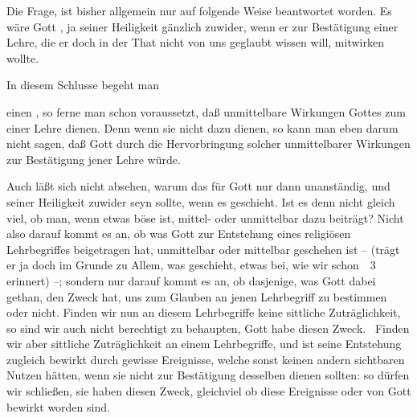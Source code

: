 Die Frage,  ist bisher allgemein nur auf folgende Weise beantwortet worden. Es wäre Gott , ja seiner Heiligkeit gänzlich zuwider, wenn er zur Bestätigung einer Lehre, die er doch in der That nicht von uns geglaubt wissen will,  mitwirken wollte.\par
In diesem Schlusse begeht man
\begin{aufza}
\item einen , so ferne man schon voraussetzt, daß unmittelbare Wirkungen Gottes zum  einer Lehre dienen. Denn wenn sie nicht dazu dienen, so kann man eben darum nicht sagen, daß Gott durch die Hervorbringung solcher unmittelbarer Wirkungen zur Bestätigung jener Lehre  würde.
\item Auch läßt sich nicht absehen, warum das  für Gott nur dann unanständig, und seiner Heiligkeit zuwider seyn sollte, wenn es  geschieht. Ist es denn nicht gleich viel, ob man, wenn etwas böse ist, mittel- oder unmittelbar dazu beiträgt? Nicht also darauf kommt es an, ob was Gott zur Entstehung eines religiösen Lehrbegriffes beigetragen hat, unmittelbar oder mittelbar geschehen ist -- (trägt er ja doch im Grunde zu Allem, was geschieht, etwas  bei, wie wir schon \ \no\,3 erinnert) --; sondern nur darauf kommt es an, ob dasjenige, was Gott dabei gethan, den Zweck hat, uns zum Glauben an jenen Lehrbegriff zu bestimmen oder nicht. Finden wir nun an diesem Lehrbegriffe keine sittliche Zuträglichkeit, so sind wir auch nicht berechtigt zu behaupten, Gott habe diesen Zweck.~ Finden wir aber sittliche Zuträglichkeit an einem Lehrbegriffe, und ist seine Entstehung zugleich bewirkt durch gewisse Ereignisse, welche sonst keinen andern sichtbaren Nutzen hätten, wenn sie nicht zur Bestätigung desselben dienen sollten: so dürfen wir schließen, sie haben diesen Zweck, gleichviel ob diese Ereignisse  oder  von Gott bewirkt worden sind.  
\end{aufza}
   
